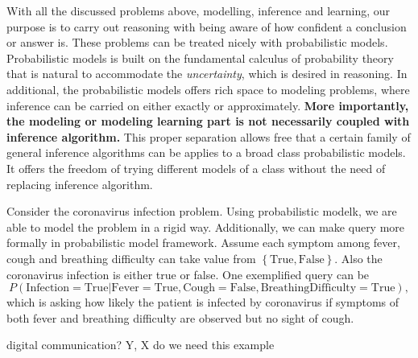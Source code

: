 With all the discussed problems above, modelling, inference and learning, our purpose is to carry out reasoning with being aware of how confident a conclusion or answer is. 
These problems can be treated nicely with probabilistic models. Probabilistic models is built on the fundamental calculus of probability theory that is natural to accommodate the \textit{uncertainty}, which is desired in reasoning. In additional, the probabilistic models offers rich space to modeling problems, where inference can be carried on either exactly or approximately. \textbf{More importantly, the modeling or modeling learning part is not necessarily coupled with inference algorithm.} This proper separation allows free that a certain family of general inference algorithms can be applies to a broad class probabilistic models. It offers the freedom of trying different models of a class without the need of replacing inference algorithm. 

\begin{example}\label{example-corona}
  Consider the coronavirus infection problem. Using probabilistic modelk, we are able to model the problem in a rigid way. Additionally, we can make query more formally in probabilistic model framework. Assume each symptom among fever, cough and breathing difficulty can take value from $\left\{ \mathrm{True}, \mathrm{False} \right\}$. Also the coronavirus infection is either true or false. One exemplified query can be
  \begin{equation}
    P(\mathrm{Infection} = \mathrm{True} | \mathrm{Fever} = \mathrm{True}, \mathrm{Cough} = \mathrm{False}, \mathrm{Breathing Difficulty}= \mathrm{True}), \nonumber
  \end{equation}
  which is asking how likely the patient is infected by coronavirus if symptoms of both fever and breathing difficulty are observed but no sight of cough.

\end{example}

\begin{example}
  digital communication? Y, X do we need this example
\end{example}

